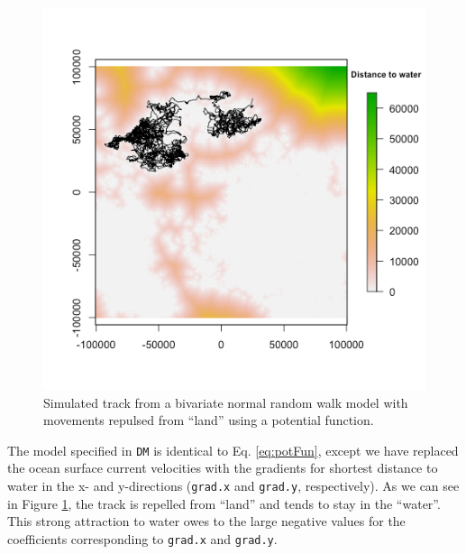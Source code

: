 \documentclass[12pt]{article}\usepackage[]{graphicx}\usepackage[]{xcolor}
\begin{document}
\begin{figure}[htbp]
  \centering
  \includegraphics[width=\textwidth]{plot_landConstraintExample.png}
  \caption{Simulated track from a bivariate normal random walk model with movements repulsed from ``land'' using a potential function.}
  \label{fig:landConstraint}
\end{figure}
The model specified in \verb|DM| is identical to Eq. \ref{eq:potFun}, except we have replaced the ocean surface current velocities with the gradients for shortest distance to water in the x- and y-directions (\verb|grad.x| and \verb|grad.y|, respectively). As we can see in Figure \ref{fig:landConstraint}, the track is repelled from ``land'' and tends to stay in the ``water''. This strong attraction to water owes to the large negative values for the coefficients corresponding to \verb|grad.x| and \verb|grad.y|. 
\end{document}
